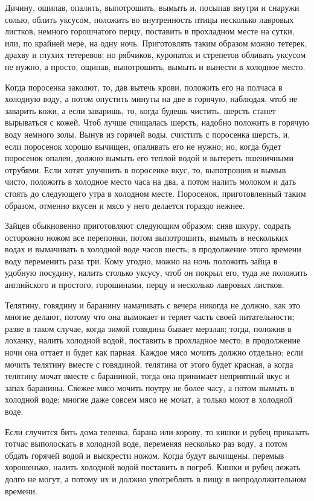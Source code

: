 Дичину, ощипав, опалить, выпотрошить, вымыть и, посыпав внутри и снаружи солью, облить уксусом, положить во внутренность птицы несколько лавровых листков, немного горошчатого перцу, поставить в прохладном месте на сутки, или, по крайней мере, на одну ночь. Приготовлять таким образом можно тетерек, драхву и глухих тетеревов; но рябчиков, куропаток и стрепетов обливать уксусом не нужно, а просто, ощипав, выпотрошить, вымыть и вынести в холодное место.

Когда поросенка заколют, то, дав вытечь крови, положить его на полчаса в холодную воду, а потом опустить минуты на две в горячую, наблюдая, чтоб не заварить кожи, а если заваришь, то, когда будешь чистить, шерсть станет вырываться с кожей. Чтоб лучше счищалась шерсть, надобно положить в горячую воду немного золы. Вынув из горячей воды, счистить с поросенка шерсть, и, если поросенок хорошо вычищен, опаливать его не нужно; но, когда будет поросенок опален, должно вымыть его теплой водой и вытереть пшеничными отрубями. Если хотят улучшить в поросенке вкус, то, выпотрошив и вымыв чисто, положить в холодное место часа на два, а потом налить молоком и дать стоять до следующего утра в холодном месте. Поросенок, приготовленный таким образом, отменно вкусен и мясо у него делается гораздо нежнее.

Зайцев обыкновенно приготовляют следующим образом: сняв шкуру, содрать осторожно ножом все перепонки, потом выпотрошить, вымыть в нескольких водах и вымачивать в холодной воде часов шесть; в продолжение этого времени воду переменить раза три. Кому угодно, можно на ночь положить зайца в удобную посудину, налить столько уксусу, чтоб он покрыл его, туда же положить английского и простого, горошинами, перцу и несколько лавровых листков.

Телятину, говядину и баранину намачивать с вечера никогда не должно, как это многие делают, потому что она вымокает и теряет часть своей питательности; разве в таком случае, когда зимой говядина бывает мерзлая; тогда, положив в лоханку, налить холодной водой, поставить в прохладное место; в продолжение ночи она оттает и будет как парная. Каждое мясо мочить должно отдельно; если мочить телятину вместе с говядиной, телятина от этого будет красная, а когда телятину мочат вместе с бараниной, тогда она принимает неприятный вкус и запах баранины. Свежее мясо мочить поутру не более часу, а потом вымыть в холодной воде; многие даже совсем мясо не мочат, а только моют в холодной воде.

Если случится бить дома теленка, барана или корову, то кишки и рубец приказать тотчас выполоскать в холодной воде, переменяя несколько раз воду, а потом обдать горячей водой и выскрести ножом. Когда будут вычищены, перемыв хорошенько, налить холодной водой поставить в погреб. Кишки и рубец лежать долго не могут, а потому их и должно употреблять в пищу в непродолжительном времени.

